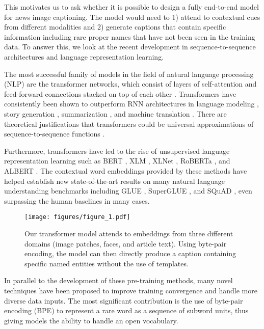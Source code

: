 \documentclass[10pt,twocolumn,letterpaper]{article}
\begin{document}
This motivates us to ask whether it is possible to design a fully end-to-end
model for news image captioning. The model would need to 1) attend to
contextual cues from different modalities and 2) generate captions that contain
specific information including rare proper names that have not been seen in the
training data. To answer this, we look at the recent development in
sequence-to-sequence architectures and language representation learning.

The most successful family of models in the field of natural language
processing (NLP) are the transformer networks, which consist of layers of
self-attention and feed-forward connections stacked on top of each other
\cite{Vaswani2017AttentionIA}. Transformers have consistently been shown to
outperform RNN architectures in language modeling \cite{Radford2019LanguageMA},
story generation \cite{Fan2018HierarchicalNS}, summarization
\cite{Subramanian2019OnEA}, and machine translation \cite{Bojar2018Findings}.
There are theoretical justifications that transformers could be universal
approximations of sequence-to-sequence functions \cite{Anonymous2020AreTU}.

Furthermore, transformers have led to the rise of unsupervised language
representation learning such as BERT \cite{Devlin2019BERT}, XLM
\cite{Lample2019CrosslingualLM}, XLNet \cite{Yang2019XLNetGA}, RoBERTa
\cite{Liu2019RoBERTaAR}, and ALBERT \cite{Lan2019ALBERT}. The contextual word
embeddings provided by these methods have helped establish new state-of-the-art
results on many natural language understanding benchmarks including GLUE
\cite{Wang2019GLUE}, SuperGLUE \cite{Wang2019SuperGLUEAS}, and SQuAD
\cite{Rajpurkar2016SQuAD, Rajpurkar2018KnowWY}, even surpassing the human
baselines in many cases.

\begin{figure}[t]
   \begin{center}
      \texttt{[image: figures/figure\_1.pdf]}
   \end{center}
      \caption{Our transformer model attends to embeddings from three different
      domains (image patches, faces, and article text). Using byte-pair
      encoding, the model can then directly produce a caption containing
      specific named entities without the use of templates.}
   \label{fig:long}
   \label{fig:onecol}
\end{figure}

In parallel to the development of these pre-training methods, many novel
techniques have been proposed to improve training convergence and handle more
diverse data inputs. The most significant contribution is the use of byte-pair
encoding (BPE) \cite{Sennrich2015NeuralMT} to represent a rare word as a
sequence of subword units, thus giving models the ability to handle an open
vocabulary.
\end{document}
